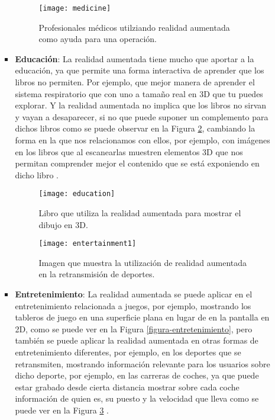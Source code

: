 \begin{itemize}
\begin{itemize}
\begin{itemize}
  \begin{figure}[h]
    \centering
    \texttt{[image: medicine]}
    \caption{Profesionales médicos utilziando realidad aumentada como ayuda para una operación.\protect\footnotemark}
    \label{figura-medicina}
  \end{figure}


  \newpage

  \item \textbf{Educación}: La realidad aumentada tiene mucho que aportar a la educación, ya que permite una forma interactiva de aprender que los libros no permiten. Por ejemplo, que mejor manera de aprender el sistema respiratorio que con uno a tamaño real en 3D que tu puedes explorar. Y la realidad aumentada no implica que los libros no sirvan y vayan a desaparecer, si no que puede suponer un complemento para dichos libros como se puede observar en la Figura \ref{figura-educacion}, cambiando la forma en la que nos relacionamos con ellos, por ejemplo, con imágenes en los libros que al escanearlas muestren elementos 3D que nos permitan comprender mejor el contenido que se está exponiendo en dicho libro \cite{reinoso}.

  \begin{figure}[h]
    \centering
    \texttt{[image: education]}
    \caption{Libro que utiliza la realidad aumentada para mostrar el dibujo en 3D.\protect\footnotemark}
    \label{figura-educacion}
  \end{figure}


  \begin{figure}[h]
    \centering
    \texttt{[image: entertainment1]}
    \caption{Imagen que muestra la utilización de realidad aumentada en la retransmisión de deportes. \cite{van-krevelen}}
    \label{figura-entretenimiento1}
  \end{figure}

  \item \textbf{Entretenimiento}: La realidad aumentada se puede aplicar en el entretenimiento relacionada a juegos, por ejemplo, mostrando los tableros de juego en una superficie plana en lugar de en la pantalla en 2D, como se puede ver en la Figura \ref{figura-entretenimiento}, pero también se puede aplicar la realidad aumentada en otras formas de entretenimiento diferentes, por ejemplo, en los deportes que se retransmiten, mostrando información relevante para los usuarios sobre dicho deporte, por ejemplo, en las carreras de coches, ya que puede estar grabado desde cierta distancia mostrar sobre cada coche información de quien es, su puesto y la velocidad que lleva como se puede ver en la Figura \ref{figura-entretenimiento1} \cite{van-krevelen}.


\end{itemize}
\end{itemize}
\end{itemize}
